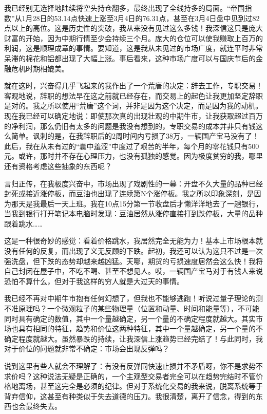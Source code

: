 我已经别无选择地陆续将空头持仓翻多，最终出现了全线持多的局面。“帝国指数”从1月28日的53.14点快速上涨至3月4日的76.31点，甚至在3月4日盘中见到过82点以上的高位。这是历史性的突破，我从来没有见过这么多钱！我深信这只是庞大财富的开始，因为中期行情至少会持续三个月。庞大的仓位可以使我赚取上百万的利润，这是顺理成章的事情。要知道，这是我从未见过的市场广度，就连平时非常呆滞的棉花和铝都出现了大幅上涨。事后看来，这种市场广度可以与国庆节后的金融危机时期相媲美。

就在这时，兴奋得几乎飞起来的我作出了一个荒唐的决定：辞去工作，专职交易！客观地说，辞职的想法早在这之前就已经存在，而交易上的起色让我更加坚定辞职是对的。我之所以使用“荒唐”这个词，并非是因为这个决定，而是因为我的动机。现在我已经可以确定地说：即使那次真的出现壮观的中期牛市，让我获取超过百万的净利润，那么仍旧有太多的问题是我没有想到的，专职交易的成本并非只有钱这么简单。讽刺的是，在我辞职后的2周时间内亏损了38万，一辆国产宝马没有了！此后，我在从未有过的“囊中羞涩”中度过了艰苦的半年，每个月的零花钱只有500元。或许，那时并不存在心理压力，也没有孤独的感觉。因为极度贫穷的我，哪里还有资格考虑这些抽象的东西呢？

言归正传，在我极度兴奋中，市场出现了戏剧性的一幕：开盘不久大量的品种已经封死或接近涨停板，而豆油也出现了连续第N个涨停板。我之所以印象深刻，是因为那天是我最后一天上班。我在10点15分第一节收盘后才懒洋洋地去了一趟银行，当我到银行打开笔记本电脑时发现：豆油居然从涨停直接打到跌停板，大量的品种跟着跳水……

这是一种很奇妙的感觉：看着价格跳水，我居然完全无能为力！基本上市场根本就没有任何的反复，而出现了义无反顾的下跌。起初，我还可以认为这只不过是一次强洗盘，但下跌的态势却越来越凶猛。天哪，期货的亏损速度居然会这么快！我将自己封闭在屋子中，不吃不喝、甚至不想见人。哎，一辆国产宝马对于有钱人来说恐怕不算什么，但对于我这样的穷人就是大过天的事情。

我已经不再对中期牛市抱有任何幻想了，但我也不能够逃跑！听说过量子理论的测不准原理吗？一个微观粒子的某些物理量（位置和动量、时间和能量等），不可能同时具有确定的数值，其中一个量越确定，另一个量的不确定程度就越大。其实市场也具有相同的特征，趋势和价位这两种特征，其中一个量越确定，另一个量的不确定程度就越大。虽然暴跌的持续，让我深信上涨趋势已经完结了！与此同时，我对于价位的问题就非常不确定：市场会出现反弹吗？

说到这里有些人就会不理解了：有没有反弹同快速止损并不矛盾呀，你不是求势不求价吗？这种说法无疑是正确的，一个主观型交易者完全可以在趋势完结时不管价格地离场，甚至这完全是必须的纪律。但对于系统化交易的我来说，脱离系统等于背弃信仰，这甚至有种类似于失去道德的压力。我很清楚，离开了信念，得到的东西也会最终失去。

